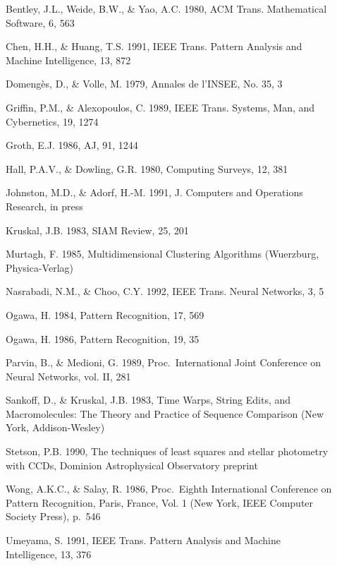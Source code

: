 \begin{description}

\item[] Bentley, J.L., Weide, B.W., \& Yao, A.C. 1980,
ACM Trans. Mathematical Software, 6, 563

\item[] Chen, H.H., \& Huang, T.S. 1991,
IEEE Trans. Pattern Analysis and Machine Intelligence, 13, 872

\item[] Domeng\`es, D., \& Volle, M. 1979,
Annales de l'INSEE, No. 35, 3

\item[] Griffin, P.M., \& Alexopoulos, C. 1989,
IEEE Trans. Systems, Man, and Cybernetics,
19, 1274

\item[] Groth, E.J. 1986, AJ, 91, 1244

\item[] Hall, P.A.V., \& Dowling, G.R. 1980,  
Computing Surveys, 12, 381

\item[] Johnston, M.D., \& Adorf, H.-M. 1991,
J. Computers and
Operations Research, in press

\item[] Kruskal, J.B. 1983, 
SIAM Review, 25, 201

\item[] Murtagh, F. 1985, Multidimensional Clustering Algorithms
(Wuerzburg, Physica-Verlag)

\item[] Nasrabadi, N.M., \& Choo, C.Y. 1992,
IEEE Trans. Neural Networks, 3, 5

\item[] Ogawa, H. 1984, 
Pattern Recognition, 17, 569

\item[] Ogawa, H. 1986, 
Pattern Recognition, 19, 35

\item[] Parvin, B., \& Medioni, G. 1989,
Proc.\  International Joint Conference on Neural Networks, vol. II, 281

\item[] Sankoff, D., \& Kruskal, J.B. 1983, 
Time Warps, String Edits, and
Macromolecules: The Theory and Practice of Sequence Comparison
(New York, Addison-Wesley)

\item[] Stetson, P.B. 1990, The techniques of least squares and stellar 
photometry with CCDs,  Dominion Astrophysical Observatory preprint

\item[] Wong, A.K.C., \& Salay, R. 1986, 
Proc.\ Eighth International Conference on Pattern Recognition, Paris, France,
Vol. 1 (New York, IEEE Computer Society Press), p.\ 546

\item[] Umeyama, S. 1991, 
IEEE Trans. Pattern Analysis and Machine Intelligence, 13, 376

\end{description}

